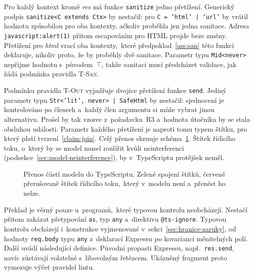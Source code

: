 Pro každý kontext kromě \emph{res} má funkce \texttt{sanitize} jedno přetížení. Generický podpis \texttt{sanitize<C extends Ctx>} by nestačil: pro \texttt{C = 'html' | 'url'} by vrátil hodnotu způsobilou pro oba kontexty, ačkoliv proběhla jen jedna sanitace. Adresa \texttt{javascript:alert(1)} přitom escapováním pro HTML projde beze změny. Přetížení pro \emph{html} vrací oba kontexty,~které předpoklad~\ref{ass:san} této funkci deklaruje, nikoliv proto, že by proběhly dvě sanitace. Parametr typu \texttt{Mid<never>} nepřijme hodnotu s~původem~$\top$, takže sanitaci musí předcházet validace, jak žádá podmínka pravidla \textsc{T-San}.

Podmínku pravidla \textsc{T-Out} vyjadřuje dvojice přetížení funkce \texttt{send}. Jediný parametr typu \texttt{Str<'lit', never> | SafeHtml} by nestačil: sjednocení je kontrolováno po členech a~každý člen argumentu si může vybrat jinou alternativu. Prošel by tak vzorec z~požadavku~R3 a~hodnota útočníka by se stala obsluhou události. Parametr každého přetížení je naproti tomu typem štítku, pro který platí tvrzení~\ref{claim:join}. Celý přenos shrnuje schéma~\ref{fig:vnoreni}. Štítek řídicího toku, o~který by se model musel rozšířit kvůli neinterferenci (podsekce~\ref{sec:model-neinterference}), by v~TypeScriptu protějšek neměl.

\begin{figure}[htbp]
    \centering
    \caption[Přenos částí modelu do TypeScriptu]{Přenos částí modelu do TypeScriptu. Zeleně spojení štítků, červeně přerušovaně štítek řídicího toku,~který v~modelu není a~přenést ho nelze.}
    \label{fig:vnoreni}
\end{figure}

Překlad je věrný pouze u~programů,~které typovou kontrolu neobcházejí. Nestačí přitom zakázat přetypování \texttt{as}, typ \texttt{any} a~direktivu \texttt{@ts-ignore}. Typovou kontrolu obcházejí i~konstrukce vyjmenované v~sekci~\ref{sec:hranice-zaruky}, od hodnoty \texttt{req.body} typu \texttt{any} z~deklarací Expressu po kovarianci měnitelných polí. Další uvádí následující definice. Původní propasti Expressu, např.~\texttt{res.send}, navíc zůstávají volatelné s~libovolným řetězcem. Ukázněný fragment proto vymezuje výčet pravidel lintu.

